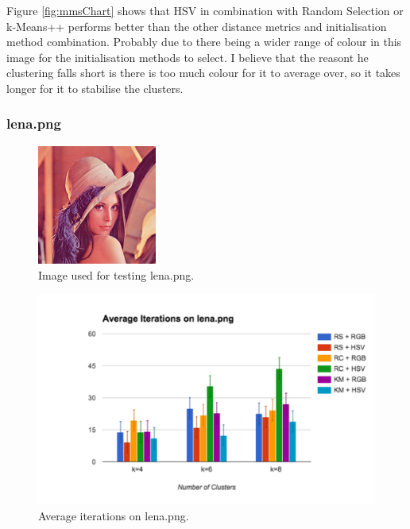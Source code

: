 \documentclass{article}
\begin{document}
Figure \ref{fig:mmsChart} shows that HSV in combination with Random Selection or
k-Means++ performs better than the other distance metrics and initialisation
method combination. Probably due to there being a wider range of colour in this
image for the initialisation methods to select. I believe that the reasont he
clustering falls short is there is too much colour for it to average over, so it
takes longer for it to stabilise the clusters.

\subsubsection{lena.png}

\begin{figure}[!ht]
\begin{center}
\includegraphics[width=0.35\textwidth]{images/lena}
\caption{Image used for testing lena.png.}
\label{fig:lenaTest}
\end{center}
\end{figure}

\begin{figure}[!ht]
\begin{center}
\includegraphics[width=1\textwidth]{images/lenaChart}
\caption{Average iterations on lena.png.}
\label{fig:lenaChart}
\end{center}
\end{figure}
\end{document}
